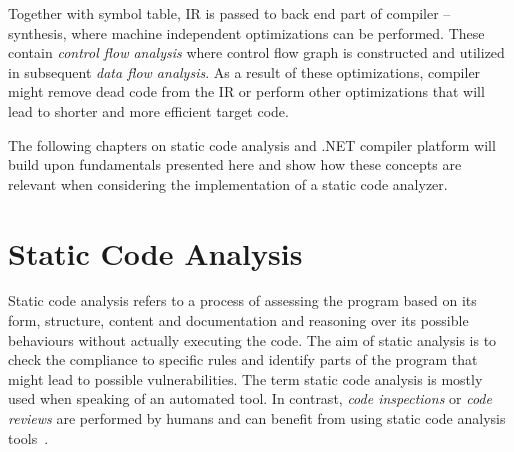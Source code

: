 \documentclass[
  digital, %
  table,   %
  lof,     %
  lot,     %
  oneside,
]{fithesis3}
\begin{document}
\bigskip
Together with symbol table, IR is passed to back end part of compiler -- synthesis, where machine independent optimizations can be performed. These contain \textit{control flow analysis} where control flow graph is constructed and utilized in subsequent \textit{data flow analysis}. As a result of these optimizations, compiler might remove dead code from the IR or perform other optimizations that will lead to shorter and more efficient target code.

\bigskip
The following chapters on static code analysis and .NET compiler platform will build upon fundamentals presented here and show how these concepts are relevant when considering the implementation of a static code analyzer.

  \newpage
\chapter{Static Code Analysis}
\label{chap:static-code-analysis}
Static code analysis refers to a process of assessing the program based on its form, structure, content and documentation and reasoning over its possible behaviours without actually executing the code. The aim of static analysis is to check the compliance to specific rules and identify parts of the program that might lead to possible vulnerabilities. The term static code analysis is mostly used when speaking of an automated tool. In contrast, \textit{code inspections} or \textit{code reviews} are performed by humans and can benefit from using static code analysis tools~\cite{oswap-sca, ppt-sca}.
\end{document}
